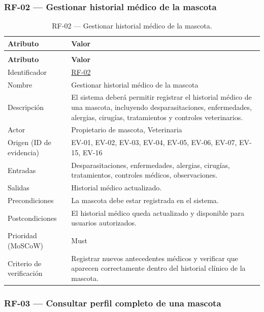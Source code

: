 \documentclass[journal,onecolumn]{IEEEtran}
\makeatletter
\newenvironment{atributos}[2]{%
	\small
	\begin{longtable}{@{}>{\raggedright\arraybackslash}p{4.2cm} >{\raggedright\arraybackslash}p{11.2cm}@{}}
		\caption{#2}\label{tab:#1}\\
		\toprule
		\textbf{Atributo} & \textbf{Valor} \\
		\midrule
		\endfirsthead
		\multicolumn{2}{@{}l}{\small\itshape (continuación)}\\
		\toprule
		\textbf{Atributo} & \textbf{Valor} \\
		\midrule
		\endhead
		\bottomrule
		\endlastfoot
	}{%
	\end{longtable}
	\normalsize
}
\makeatother
\begin{document}
	\subsubsection{RF-02 --- Gestionar historial médico de la mascota}
	
	\begin{atributos}{RF-02}{RF-02 --- Gestionar historial médico de la mascota.}
		Identificador & \hyperref[tab:RF-02]{RF-02} \\
		Nombre & Gestionar historial médico de la mascota \\
		Descripción & El sistema deberá permitir registrar el historial médico de una mascota, incluyendo desparasitaciones, enfermedades, alergias, cirugías, tratamientos y controles veterinarios. \\
		Actor & Propietario de mascota, Veterinaria \\
		Origen (ID de evidencia) & EV-01, EV-02, EV-03, EV-04, EV-05, EV-06, EV-07, EV-15, EV-16 \\
		Entradas & Desparasitaciones, enfermedades, alergias, cirugías, tratamientos, controles médicos, observaciones. \\
		Salidas & Historial médico actualizado. \\
		Precondiciones & La mascota debe estar registrada en el sistema. \\
		Postcondiciones & El historial médico queda actualizado y disponible para usuarios autorizados. \\
		Prioridad (MoSCoW) & Must \\
		Criterio de verificación & Registrar nuevos antecedentes médicos y verificar que aparecen correctamente dentro del historial clínico de la mascota. \\
	\end{atributos}
	
	\subsubsection{RF-03 --- Consultar perfil completo de una mascota}
	
\end{document}
